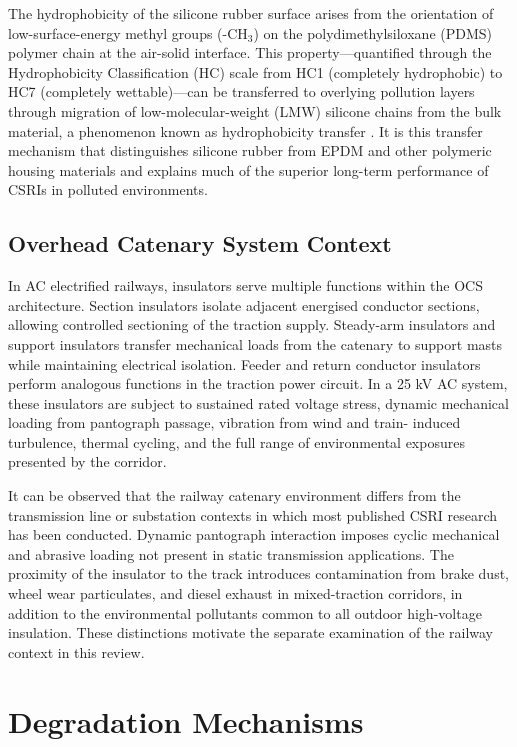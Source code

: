 \documentclass[preprint,12pt,3p]{elsarticle}
\begin{document}
The hydrophobicity of the silicone rubber surface arises from the
orientation of low-surface-energy methyl groups (-CH$_3$) on the
polydimethylsiloxane (PDMS) polymer chain at the air-solid interface.
This property---quantified through the Hydrophobicity Classification
(HC) scale from HC1 (completely hydrophobic) to HC7 (completely
wettable)---can be transferred to overlying pollution layers through
migration of low-molecular-weight (LMW) silicone chains from the bulk
material, a phenomenon known as hydrophobicity transfer \cite{Gubanski1990,
Kindersberger2008}. It is this transfer mechanism that distinguishes
silicone rubber from EPDM and other polymeric housing materials and
explains much of the superior long-term performance of CSRIs in polluted
environments.

\subsection{Overhead Catenary System Context}

In AC electrified railways, insulators serve multiple functions within
the OCS architecture. Section insulators isolate adjacent energised
conductor sections, allowing controlled sectioning of the traction
supply. Steady-arm insulators and support insulators transfer mechanical
loads from the catenary to support masts while maintaining electrical
isolation. Feeder and return conductor insulators perform analogous
functions in the traction power circuit. In a 25 kV AC system, these
insulators are subject to sustained rated voltage stress, dynamic
mechanical loading from pantograph passage, vibration from wind and train-
induced turbulence, thermal cycling, and the full range of environmental
exposures presented by the corridor.

It can be observed that the railway catenary environment differs from
the transmission line or substation contexts in which most published
CSRI research has been conducted. Dynamic pantograph interaction imposes
cyclic mechanical and abrasive loading not present in static transmission
applications. The proximity of the insulator to the track introduces
contamination from brake dust, wheel wear particulates, and diesel
exhaust in mixed-traction corridors, in addition to the environmental
pollutants common to all outdoor high-voltage insulation. These
distinctions motivate the separate examination of the railway context
in this review.


\section{Degradation Mechanisms}
\label{sec:degradation}
\end{document}
